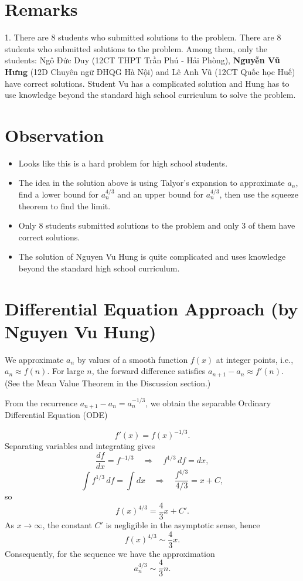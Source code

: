 \documentclass{article}
\begin{document}
\section*{Remarks}
1. There are 8 students who submitted solutions to the problem. 
There are 8 students who submitted solutions to the problem.
Among them, only the students: Ngô Đức Duy (12CT THPT Trần Phú - Hải Phòng), 
\textbf{Nguyễn Vũ Hưng} (12D Chuyên ngữ ĐHQG Hà Nội) and 
Lê Anh Vũ (12CT Quốc học Huế) have correct solutions.
Student Vu has a complicated solution and Hung has to use knowledge beyond the standard high school curriculum to solve the problem.

\section{Observation}
\begin{itemize}
    \item Looks like this is a hard problem for high school students.
    \item The idea in the solution above is using Talyor's expansion to approximate $a_n$, find a lower bound for $a_n^{4/3}$ and an upper bound for $a_n^{4/3}$, then use the squeeze theorem to find the limit.
    \item Only 8 students submitted solutions to the problem and only 3 of them have correct solutions.
    \item The solution of Nguyen Vu Hung is quite complicated and uses knowledge beyond the standard high school curriculum. 
\end{itemize}


\section{Differential Equation Approach (by Nguyen Vu Hung)}
We approximate $a_n$ by values of a smooth function $f(x)$ at 
integer points, i.e., $a_n \approx f(n)$. 
For large $n$, the forward difference satisfies $a_{n+1} - a_n \approx f'(n)$.
(See the Mean Value Theorem in the Discussion section.)

From the recurrence $a_{n+1} - a_n = a_n^{-1/3}$, we obtain the separable Ordinary Differential Equation (ODE)

$$ f'(x) = f(x)^{-1/3}. $$
Separating variables and integrating gives
$$ \frac{df}{dx} = f^{-1/3} \quad \Rightarrow \quad f^{1/3}\, df = dx, $$
$$ \int f^{1/3}\, df = \int dx \quad \Rightarrow \quad \frac{f^{4/3}}{4/3} = x + C, $$
so
$$ f(x)^{4/3} = \frac{4}{3}x + C'. $$
As $x \to \infty$, the constant $C'$ is negligible in the asymptotic sense, hence
$$ f(x)^{4/3} \sim \frac{4}{3}x. $$
Consequently, for the sequence we have the approximation
$$ a_n^{4/3} \sim \frac{4}{3}n. $$
\end{document}
